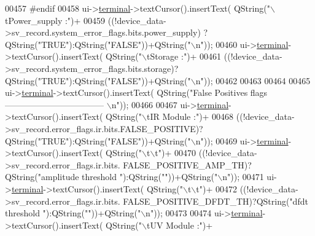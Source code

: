 \begin{DoxyCode}
00457 \textcolor{preprocessor}{#endif}
00458        ui->\hyperlink{a00080_aae71c46ea4546df5994735dee573b2dd}{terminal}->textCursor().insertText( QString(\textcolor{stringliteral}{"\(\backslash\)tPower\_supply :"})+
00459                                             ((!device\_data->sv\_record.system\_error\_flags.bits.power\_supply)
      ?QString(\textcolor{stringliteral}{"TRUE"}):QString(\textcolor{stringliteral}{"FALSE"}))+QString(\textcolor{stringliteral}{"\(\backslash\)n"}));
00460        ui->\hyperlink{a00080_aae71c46ea4546df5994735dee573b2dd}{terminal}->textCursor().insertText( QString(\textcolor{stringliteral}{"\(\backslash\)tStorage :"})+
00461                                             ((!device\_data->sv\_record.system\_error\_flags.bits.storage)?
      QString(\textcolor{stringliteral}{"TRUE"}):QString(\textcolor{stringliteral}{"FALSE"}))+QString(\textcolor{stringliteral}{"\(\backslash\)n"}));
00462 
00463 
00464 
00465        ui->\hyperlink{a00080_aae71c46ea4546df5994735dee573b2dd}{terminal}->textCursor().insertText( QString(\textcolor{stringliteral}{"False Positives flags 
       ----------------------------------- \(\backslash\)n"}));
00466 
00467        ui->\hyperlink{a00080_aae71c46ea4546df5994735dee573b2dd}{terminal}->textCursor().insertText( QString(\textcolor{stringliteral}{"\(\backslash\)tIR Module :"})+
00468                                             ((!device\_data->sv\_record.error\_flags.ir.bits.FALSE\_POSITIVE)?
      QString(\textcolor{stringliteral}{"TRUE"}):QString(\textcolor{stringliteral}{"FALSE"}))+QString(\textcolor{stringliteral}{"\(\backslash\)n"}));
00469        ui->\hyperlink{a00080_aae71c46ea4546df5994735dee573b2dd}{terminal}->textCursor().insertText( QString(\textcolor{stringliteral}{"\(\backslash\)t\(\backslash\)t"})+
00470                                             ((!device\_data->sv\_record.error\_flags.ir.bits.
      FALSE\_POSITIVE\_AMP\_TH)?QString(\textcolor{stringliteral}{"amplitude threshold "}):QString(\textcolor{stringliteral}{""}))+QString(\textcolor{stringliteral}{"\(\backslash\)n"}));
00471        ui->\hyperlink{a00080_aae71c46ea4546df5994735dee573b2dd}{terminal}->textCursor().insertText( QString(\textcolor{stringliteral}{"\(\backslash\)t\(\backslash\)t"})+
00472                                             ((!device\_data->sv\_record.error\_flags.ir.bits.
      FALSE\_POSITIVE\_DFDT\_TH)?QString(\textcolor{stringliteral}{"dfdt threshold "}):QString(\textcolor{stringliteral}{""}))+QString(\textcolor{stringliteral}{"\(\backslash\)n"}));
00473 
00474        ui->\hyperlink{a00080_aae71c46ea4546df5994735dee573b2dd}{terminal}->textCursor().insertText( QString(\textcolor{stringliteral}{"\(\backslash\)tUV Module :"})+

\end{DoxyCode}
